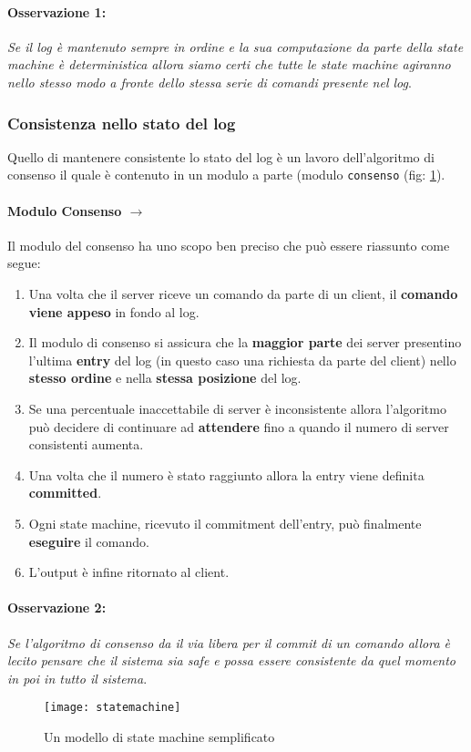 			\paragraph{Osservazione 1:} \emph{Se il log è mantenuto sempre in ordine e la sua computazione da parte della state machine è deterministica allora siamo certi che tutte le state machine agiranno nello stesso modo a fronte dello stessa serie di comandi presente nel log}.

		\subsubsection{Consistenza nello stato del log}
			Quello di mantenere consistente lo stato del log è un lavoro dell'algoritmo di consenso il quale è contenuto in un modulo a parte (modulo \texttt{consenso} (fig: \ref{fig:figure1}).
			\paragraph{Modulo Consenso $\rightarrow$}
			Il modulo del consenso ha uno scopo ben preciso che può essere riassunto come segue:\begin{enumerate}
				\item Una volta che il server riceve un comando da parte di un client, il \textbf{comando viene appeso} in fondo al log. 
				\item Il modulo di consenso si assicura che la \textbf{maggior parte} dei server presentino l'ultima \textbf{entry} del log (in questo caso una richiesta da parte del client) nello \textbf{stesso ordine} e nella \textbf{stessa posizione} del log. 
				\item Se una percentuale inaccettabile di server è inconsistente allora l'algoritmo può decidere di continuare ad \textbf{attendere} fino a quando il numero di server consistenti aumenta.
				\item Una volta che il numero è stato raggiunto allora la entry viene definita \textbf{committed}.
				\item Ogni state machine, ricevuto il commitment dell'entry, può finalmente \textbf{eseguire} il comando.
				\item L'output è infine ritornato al client.
			\end{enumerate}
			\paragraph{Osservazione 2:} \emph{Se l'algoritmo di consenso da il via libera per il commit di un comando allora è lecito pensare che il sistema sia safe e possa essere consistente da quel momento in poi in tutto il sistema}.
	\begin{figure}[H]
		\centering
		\texttt{[image: statemachine]}
		\caption{Un modello di state machine semplificato}
		\label{fig:figure1}
	\end{figure}
